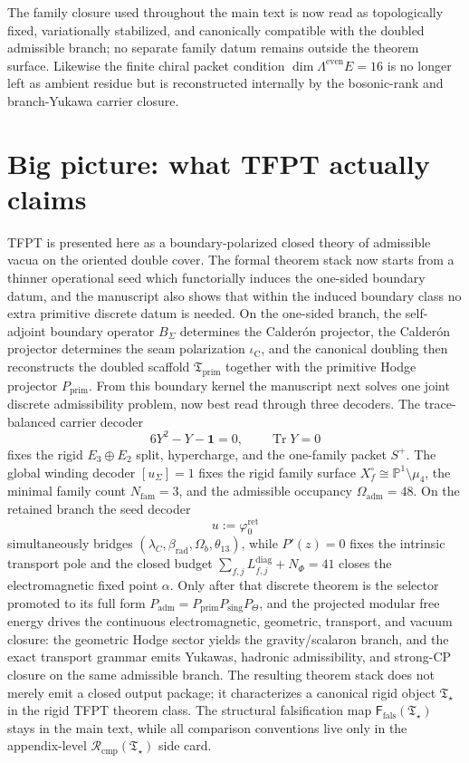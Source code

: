 \documentclass[11pt,a4paper]{article}
\theoremstyle{definition}
\theoremstyle{remark}
\DeclareMathOperator{\tr}{Tr}
\newcommand{\iC}{\iota_{\mathrm C}}
\newcommand{\phiz}{\varphi_0^{\mathrm{ret}}}
\newcommand{\Tprim}{\mathfrak T_{\mathrm{prim}}}
\newcommand{\Padm}{P_{\mathrm{adm}}}
\newcommand{\Pprim}{P_{\mathrm{prim}}}
\newcommand{\Tstar}{\mathfrak T_{\star}}
\newcommand{\Ffals}{\mathsf F_{\mathrm{fals}}}
\newcommand{\Rcmp}{\mathcal R_{\mathrm{cmp}}}
\begin{document}
The family closure used throughout the main text is now read as topologically fixed, variationally
stabilized, and canonically compatible with the doubled admissible branch; no separate family datum
remains outside the theorem surface. Likewise the finite chiral packet condition
$\dim\Lambda^{\mathrm{even}}E=16$ is no longer left as ambient residue but is reconstructed
internally by the bosonic-rank and branch-Yukawa carrier closure.

\section{Big picture: what TFPT actually claims}

TFPT is presented here as a boundary-polarized closed theory of admissible vacua on the oriented
double cover. The formal theorem stack now starts from a thinner operational seed which functorially
induces the one-sided boundary datum, and the manuscript also shows that within the induced
boundary class no extra primitive discrete datum is needed. On the
one-sided branch, the self-adjoint boundary operator $B_\Sigma$ determines the Calder\'on projector,
the Calder\'on projector determines the seam polarization
$\iC$, and the canonical doubling then reconstructs the doubled scaffold $\Tprim$ together with
the primitive Hodge projector $\Pprim$. From this boundary kernel the manuscript next solves one
joint discrete admissibility problem, now best read through three decoders. The trace-balanced
carrier decoder
\[
6Y^2-Y-\mathbf 1=0,
\qquad
\tr Y=0
\]
fixes the rigid $E_3\oplus E_2$ split, hypercharge, and the one-family packet $S^+$. The global
winding decoder $[u_\Sigma]=1$ fixes the rigid family surface $X_f^\circ\cong\mathbb P^1\setminus
\mu_4$, the minimal family count $N_{\mathrm{fam}}=3$, and the admissible occupancy
$\Omega_{\mathrm{adm}}=48$. On the retained branch the seed decoder
\[
u:=\phiz
\]
simultaneously bridges $(\lambda_C,\beta_{\mathrm{rad}},\Omega_b,\theta_{13})$, while
$P'(z)=0$ fixes the intrinsic transport pole and the closed budget
$\sum_{f,j}L_{f,j}^{\mathrm{diag}}+N_\Phi=41$ closes the electromagnetic fixed point $\alpha$.
Only after that discrete theorem is the selector promoted to its full form
$\Padm=\Pprim P_{\mathrm{sing}}P_{\Theta}$, and the projected modular free energy drives the
continuous electromagnetic, geometric, transport, and vacuum closure: the geometric Hodge sector
yields the gravity/scalaron branch, and the exact transport grammar emits Yukawas, hadronic
admissibility, and strong-CP closure on the same admissible branch. The resulting theorem stack
does not merely emit a closed output package; it characterizes a canonical rigid object $\Tstar$ in
the rigid TFPT theorem class. The structural falsification map $\Ffals(\Tstar)$ stays in the main
text, while all comparison conventions live only in the appendix-level $\Rcmp(\Tstar)$ side card.
\end{document}
